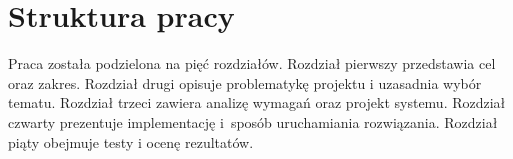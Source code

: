 \section{Struktura pracy}
Praca została podzielona na pięć rozdziałów. Rozdział pierwszy przedstawia cel oraz zakres.
Rozdział drugi opisuje problematykę projektu i uzasadnia wybór tematu. Rozdział trzeci
zawiera analizę wymagań oraz projekt systemu. Rozdział czwarty prezentuje implementację
i~sposób uruchamiania rozwiązania. Rozdział piąty obejmuje testy i ocenę rezultatów.
